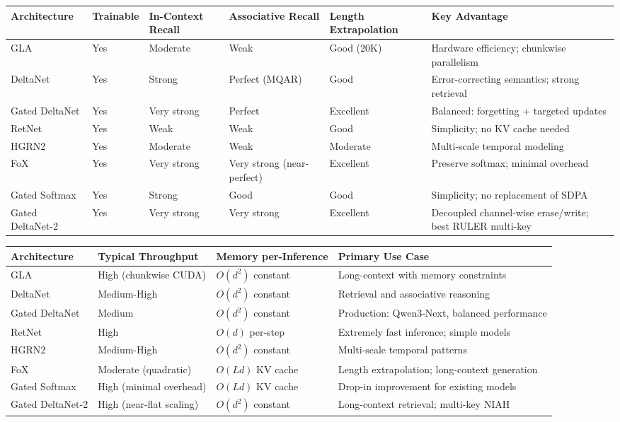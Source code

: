 \documentclass[11pt,a4paper]{article}
\begin{document}
\medskip

\footnotesize
\begin{longtable}{p{1.8cm}p{2.0cm}p{2.2cm}p{2.2cm}p{2.2cm}p{1.8cm}}
\toprule
\textbf{Architecture} & \textbf{Trainable} & \textbf{In-Context Recall} & \textbf{Associative Recall} & \textbf{Length Extrapolation} & \textbf{Key Advantage} \\
\midrule
\endhead
GLA & Yes & Moderate & Weak & Good (20K) & Hardware efficiency; chunkwise parallelism \\
DeltaNet & Yes & Strong & Perfect (MQAR) & Good & Error-correcting semantics; strong retrieval \\
Gated DeltaNet & Yes & Very strong & Perfect & Excellent & Balanced: forgetting + targeted updates \\
RetNet & Yes & Weak & Weak & Good & Simplicity; no KV cache needed \\
HGRN2 & Yes & Moderate & Weak & Moderate & Multi-scale temporal modeling \\
FoX & Yes & Very strong & Very strong (near-perfect) & Excellent & Preserve softmax; minimal overhead \\
Gated Softmax & Yes & Strong & Good & Good & Simplicity; no replacement of SDPA \\
Gated DeltaNet-2 & Yes & Very strong & Very strong & Excellent & Decoupled channel-wise erase/write; best RULER multi-key \\
\bottomrule
\end{longtable}
\normalsize

\medskip

\footnotesize
\begin{longtable}{p{2.0cm}p{2.4cm}p{2.8cm}p{3.4cm}}
\toprule
\textbf{Architecture} & \textbf{Typical Throughput} & \textbf{Memory per-Inference} & \textbf{Primary Use Case} \\
\midrule
\endhead
GLA & High (chunkwise CUDA) & $O(d^2)$ constant & Long-context with memory constraints \\
DeltaNet & Medium-High & $O(d^2)$ constant & Retrieval and associative reasoning \\
Gated DeltaNet & Medium & $O(d^2)$ constant & Production: Qwen3-Next, balanced performance \\
RetNet & High & $O(d)$ per-step & Extremely fast inference; simple models \\
HGRN2 & Medium-High & $O(d^2)$ constant & Multi-scale temporal patterns \\
FoX & Moderate (quadratic) & $O(Ld)$ KV cache & Length extrapolation; long-context generation \\
Gated Softmax & High (minimal overhead) & $O(Ld)$ KV cache & Drop-in improvement for existing models \\
Gated DeltaNet-2 & High (near-flat scaling) & $O(d^2)$ constant & Long-context retrieval; multi-key NIAH \\
\bottomrule
\end{longtable}
\normalsize
\end{document}
